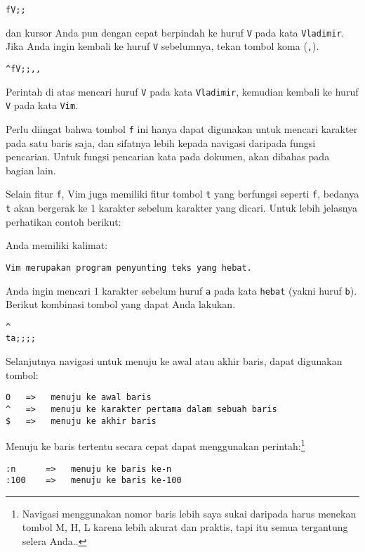 \documentclass{article}
\begin{document}
\begin{verbatim}
fV;;
\end{verbatim}

dan kursor Anda pun dengan cepat berpindah ke huruf \verb=V= pada
kata \verb=Vladimir=. Jika Anda ingin kembali ke huruf \verb=V=
sebelumnya, tekan tombol koma (\verb=,=).

\begin{verbatim}
^fV;;,,
\end{verbatim}

Perintah di atas mencari huruf \verb=V= pada kata \verb=Vladimir=,
kemudian kembali ke huruf \verb=V= pada kata \verb=Vim=.

Perlu diingat bahwa tombol \verb=f= ini hanya dapat
digunakan untuk mencari karakter pada satu baris saja, dan
sifatnya lebih kepada navigasi daripada fungsi pencarian.
Untuk fungsi pencarian kata pada dokumen, akan dibahas pada
bagian lain.

Selain fitur \verb=f=, Vim juga memiliki fitur tombol
\verb=t= yang berfungsi seperti \verb=f=, bedanya \verb=t=
akan bergerak ke 1 karakter sebelum karakter yang dicari.
Untuk lebih jelasnya perhatikan contoh berikut:

Anda memiliki kalimat:

\begin{verbatim}
Vim merupakan program penyunting teks yang hebat.
\end{verbatim}

Anda ingin mencari 1 karakter sebelum huruf \verb=a= pada
kata \verb=hebat= (yakni huruf \verb=b=). Berikut kombinasi
tombol yang dapat Anda lakukan.

\begin{verbatim}
^
ta;;;;
\end{verbatim}

Selanjutnya navigasi untuk menuju ke awal atau akhir baris,
dapat digunakan tombol:

\begin{verbatim}
0   =>   menuju ke awal baris
^   =>   menuju ke karakter pertama dalam sebuah baris
$   =>   menuju ke akhir baris
\end{verbatim}

Menuju ke baris tertentu secara cepat dapat menggunakan
perintah:\footnote{Navigasi menggunakan nomor baris lebih
    saya sukai daripada harus menekan tombol M, H, L
    karena lebih akurat dan praktis, tapi itu semua
tergantung selera Anda..}

\begin{verbatim}
:n      =>   menuju ke baris ke-n
:100    =>   menuju ke baris ke-100
\end{verbatim}
\end{document}
